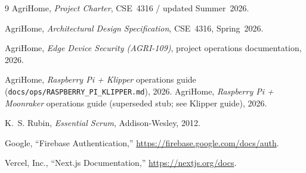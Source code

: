 \documentclass[11pt,letterpaper]{article}
\begin{document}
\newpage
\begin{thebibliography}{9}
AgriHome, \textit{Project Charter}, CSE~4316 / updated Summer~2026.

AgriHome, \textit{Architectural Design Specification}, CSE~4316, Spring~2026.

AgriHome, \textit{Edge Device Security (AGRI-109)}, project operations documentation, 2026.

AgriHome, \textit{Raspberry Pi + Klipper} operations guide (\texttt{docs/ops/RASPBERRY\_PI\_KLIPPER.md}), 2026.
AgriHome, \textit{Raspberry Pi + Moonraker} operations guide (superseded stub; see Klipper guide), 2026.

K.~S. Rubin, \textit{Essential Scrum}, Addison-Wesley, 2012.

Google, ``Firebase Authentication,'' \url{https://firebase.google.com/docs/auth}.

Vercel, Inc., ``Next.js Documentation,'' \url{https://nextjs.org/docs}.
\end{thebibliography}
\end{document}
